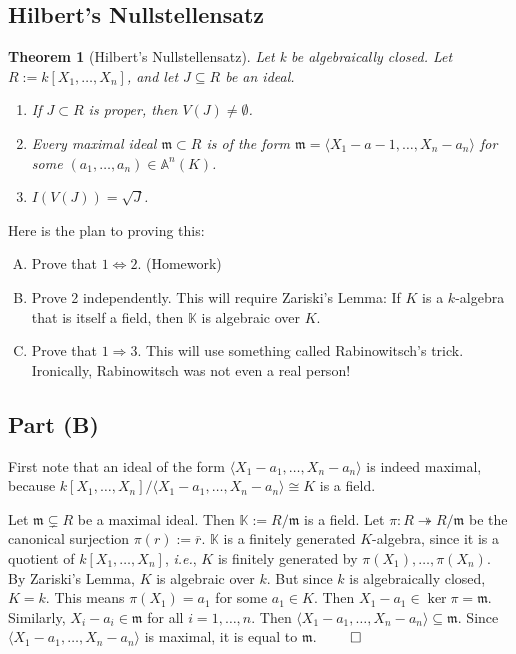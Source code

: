 \documentclass[12pt]{article}
\newcommand{\ita}[1]{\textit{#1}}
\newcommand{\vbrack}[1]{\langle #1\rangle}
\newtheorem{theorem}{Theorem}[section]
\theoremstyle{definition}
\begin{document}
\subsection{Hilbert's Nullstellensatz}
\begin{theorem}[Hilbert's Nullstellensatz]
    Let k be algebraically closed. Let $R:=k[X_1,\dotsc,X_n]$, and let $J\subseteq R$ be an ideal.
    \begin{enumerate}
        \item If $J\subset R$ is proper, then $V(J)\neq\emptyset$.
        \item Every maximal ideal $\mathfrak{m}\subset R$ is of the form $\mathfrak{m}=\vbrack{X_1-a-1,\dotsc,X_n-a_n}$ for some $(a_1,\dotsc,a_n)\in\mathbb{A}^n(K)$.
        \item $I(V(J))=\sqrt{J}$.
    \end{enumerate}
\end{theorem}
Here is the plan to proving this:
\begin{enumerate}[(A)]
    \item Prove that $1\Leftrightarrow2$. (Homework)
    \item Prove 2 independently. This will require Zariski's Lemma: If $K$ is a $k$-algebra that is itself a field, then $\mathbb{K}$ is algebraic over $K$.
    \item Prove that $1\Rightarrow3$. This will use something called Rabinowitsch's trick. Ironically, Rabinowitsch was not even a real person!
\end{enumerate}
\subsection{Part (B)}
First note that an ideal of the form $\vbrack{X_1-a_1,\dotsc,X_n-a_n}$ is indeed maximal, because $k[X_1,\dotsc,X_n]/\vbrack{X_1-a_1,\dotsc,X_n-a_n}\cong K$ is a field.

Let $\mathfrak{m}\subsetneq R$ be a maximal ideal. Then $\mathbb{K}:=R/\mathfrak{m}$ is a field. Let $\pi:R\twoheadrightarrow R/\mathfrak{m}$ be the canonical surjection $\pi(r):=\overline{r}$. $\mathbb{K}$ is a finitely generated $K$-algebra, since it is a quotient of $k[X_1,\dotsc,X_n]$, \ita{i.e.}, $K$ is finitely generated by $\pi(X_1),\dotsc,\pi(X_n)$. By Zariski's Lemma, $K$ is algebraic over $k$. But since $k$ is algebraically closed, $K=k$. This means $\pi(X_1)=a_1$ for some $a_1\in K$. Then $X_1-a_1\in\ker\pi=\mathfrak{m}$. Similarly, $X_i-a_i\in\mathfrak{m}$ for all $i=1,\dotsc,n$. Then $\vbrack{X_1-a_1,\dotsc,X_n-a_n}\subseteq\mathfrak{m}$. Since $\vbrack{X_1-a_1,\dotsc,X_n-a_n}$ is maximal, it is equal to $\mathfrak{m}$. $\qed$
\end{document}
